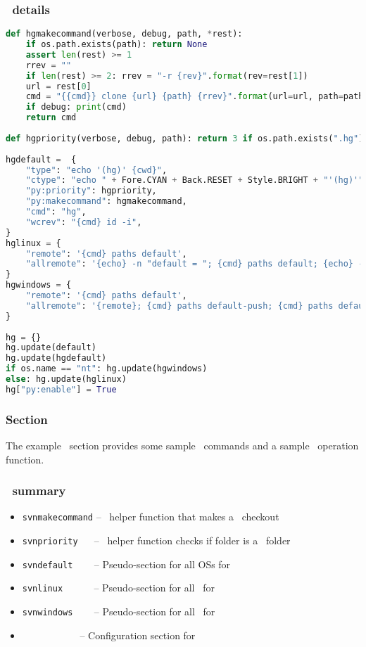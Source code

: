 \subsubsection*{\hg\ details}

\begin{snugshade}
\begin{lstlisting}[language=python]
def hgmakecommand(verbose, debug, path, *rest):
	if os.path.exists(path): return None
	assert len(rest) >= 1
	rrev = ""
	if len(rest) >= 2: rrev = "-r {rev}".format(rev=rest[1])
	url = rest[0]
	cmd = "{{cmd}} clone {url} {path} {rrev}".format(url=url, path=path, rrev=rrev)
	if debug: print(cmd)
	return cmd
	
def hgpriority(verbose, debug, path): return 3 if os.path.exists(".hg") else 0
	
hgdefault =  {
	"type": "echo '(hg)' {cwd}",
	"ctype": "echo " + Fore.CYAN + Back.RESET + Style.BRIGHT + "'(hg)'" + Fore.RESET + " {cwd}",
	"py:priority": hgpriority,
	"py:makecommand": hgmakecommand,
	"cmd": "hg",
	"wcrev": "{cmd} id -i",
}
hglinux = {
	"remote": '{cmd} paths default',
	"allremote": '{echo} -n "default = "; {cmd} paths default; {echo} -n "default-push = "; {cmd} paths default-push; {echo} -n "default-pull = "; {cmd} paths default-pull',
}
hgwindows = {
	"remote": '{cmd} paths default',
	"allremote": '{remote}; {cmd} paths default-push; {cmd} paths default-pull',
}
	
hg = {}
hg.update(default)
hg.update(hgdefault)
if os.name == "nt": hg.update(hgwindows)
else: hg.update(hglinux)
hg["py:enable"] = True
\end{lstlisting}
\end{snugshade}

\subsubsection{Section \svn}

The example \svn\ section provides some sample \Linux\ commands and a sample \Python\ operation function.

\subsubsection*{\svn\ summary}

\begin{itemize}
\item \lstinline{svnmakecommand} -- \Python\ helper function that makes a \svn\ checkout
\item \lstinline{svnpriority} ~~ -- \Python\ helper function checks if folder is a \svn\ folder
\item \lstinline{svndefault} ~~~ -- Pseudo-section for all OSs for \svn
\item \lstinline{svnlinux} ~~~~~ -- Pseudo-section for all \Linux\ for \svn
\item \lstinline{svnwindows} ~~~ -- Pseudo-section for all \Windows\ for \svn
\item \svn\ ~~~~~~~~~~ -- Configuration section for \svn
\end{itemize}

